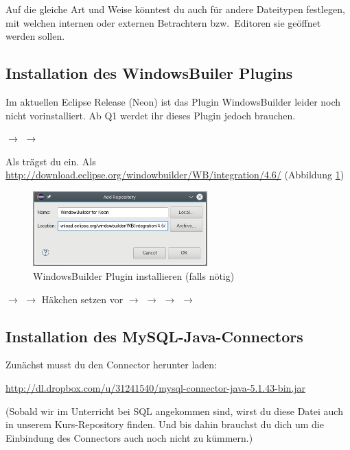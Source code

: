 Auf die gleiche Art und Weise könntest du auch für andere Dateitypen festlegen,
mit welchen internen oder externen Betrachtern bzw.\ Editoren sie geöffnet
werden sollen.


\subsection{Installation des WindowsBuiler Plugins}

Im aktuellen Eclipse Release (Neon) ist das Plugin WindowsBuilder leider noch
nicht vorinstalliert. Ab Q1 werdet ihr dieses Plugin jedoch brauchen.

 $\rightarrow$  $\rightarrow$

Als  trägst du  ein. Als
\url{http://download.eclipse.org/windowbuilder/WB/integration/4.6/} (Abbildung
\ref{fig:windowbuilder-plugin})

\begin{figure}[h]
  \centering
   \includegraphics[width=0.6\textwidth]{./inf/SEKII/01_Vorbereitung/windowbuilder_for_neon.png}
   \caption{WindowsBuilder Plugin installieren (falls nötig)}
   \label{fig:windowbuilder-plugin}
\end{figure}

$\rightarrow$  $\rightarrow$ Häkchen setzen vor 
$\rightarrow$  $\rightarrow$  $\rightarrow$
 $\rightarrow$ 


\subsection{Installation des
MySQL-Java-Connectors}\label{mysql-connector-installation}

Zunächst musst du den Connector herunter laden:

\url{http://dl.dropbox.com/u/31241540/mysql-connector-java-5.1.43-bin.jar}

(Sobald wir im Unterricht bei SQL angekommen sind, wirst du diese Datei auch in
unserem Kurs-Repository finden. Und bis dahin brauchst du dich um die
Einbindung des Connectors auch noch nicht zu kümmern.)

